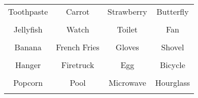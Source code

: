 \documentclass[12pt,a4paper]{article}
\begin{document}
\thispagestyle{empty}
\begin{table}[]
\centering
\Huge
\begin{tabular}{cccc}
 Toothpaste& Carrot& Strawberry& Butterfly\\  & & & \\
 Jellyfish& Watch& Toilet& Fan\\  & & & \\
 Banana& French Fries& Gloves& Shovel\\  & & & \\
 Hanger& Firetruck& Egg& Bicycle\\  & & & \\
 Popcorn& Pool& Microwave& Hourglass\\  & & & \\
\end{tabular}
\end{table}
\end{document}
